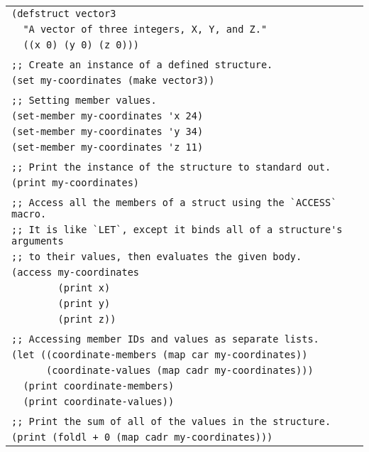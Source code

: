 \documentclass[
letterpaper,
oneside,
]{memoir}
\begin{document}
\vspace{1em}
\begin{tabular}{l}
\verb|(defstruct vector3| \\
\verb|  "A vector of three integers, X, Y, and Z."| \\
\verb|  ((x 0) (y 0) (z 0)))| \\
\\
\verb|;; Create an instance of a defined structure.| \\
\verb|(set my-coordinates (make vector3))| \\
\\
\verb|;; Setting member values.| \\
\verb|(set-member my-coordinates 'x 24)| \\
\verb|(set-member my-coordinates 'y 34)| \\
\verb|(set-member my-coordinates 'z 11)| \\
\\
\verb|;; Print the instance of the structure to standard out.| \\
\verb|(print my-coordinates)| \\
\\
\verb|;; Access all the members of a struct using the `ACCESS` macro.| \\
\verb|;; It is like `LET`, except it binds all of a structure's arguments| \\
\verb|;; to their values, then evaluates the given body.| \\
\verb|(access my-coordinates| \\
\verb|        (print x)| \\
\verb|        (print y)| \\
\verb|        (print z))| \\
\\
\verb|;; Accessing member IDs and values as separate lists.| \\
\verb|(let ((coordinate-members (map car my-coordinates))| \\
\verb|      (coordinate-values (map cadr my-coordinates)))| \\
\verb|  (print coordinate-members)| \\
\verb|  (print coordinate-values))| \\
\\
\verb|;; Print the sum of all of the values in the structure.| \\
\verb|(print (foldl + 0 (map cadr my-coordinates)))| \\
\end{tabular}
\vspace{1em}
\end{document}
